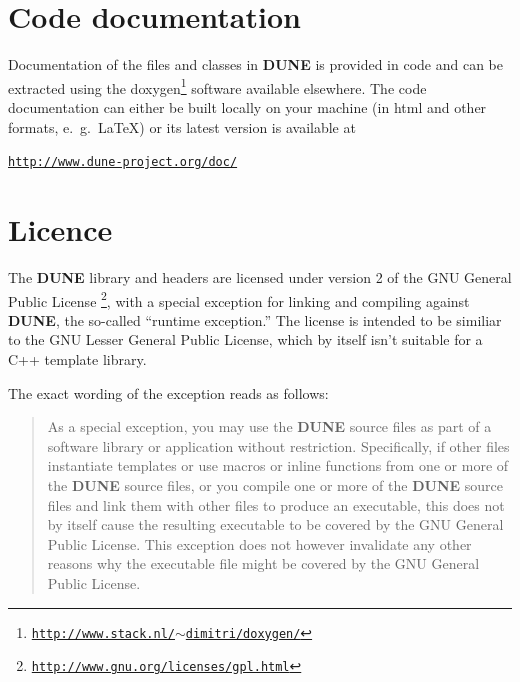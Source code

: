 \documentclass[11pt,a4paper,headinclude,footinclude,DIV16,normalheadings]{scrreprt}
\newcommand{\Dune}{{\sf\bfseries DUNE}}
\begin{document}
\section{Code documentation}

Documentation of the files and classes in \Dune{} is provided in code and
can be extracted using the
doxygen\footnote{\href{http://www.stack.nl/~dimitri/doxygen/}{\texttt{http://www.stack.nl/$\sim$dimitri/doxygen/}}}
software available elsewhere. The code documentation can either be built
locally on your machine (in html and other formats, e.~g.~\LaTeX) 
or its latest version is available at
\begin{center}
\href{http://www.dune-project.org/doc/}%
{\texttt{http://www.dune-project.org/doc/}}
\end{center}


\section{Licence}

The \Dune{} library and headers are licensed under version 2 of the
GNU General Public License%
\footnote{\href{http://www.gnu.org/licenses/gpl.html}%
  {\texttt{http://www.gnu.org/licenses/gpl.html}}}, with a special
exception for linking and compiling against \Dune{}, the so-called
``runtime exception.''  The license is intended to be similiar to the
GNU Lesser General Public License, which by itself isn't suitable for
a C++ template library.

The exact wording of the exception reads as follows:

\begin{quote}  
   As a special exception, you may use the \Dune{} source files as part
   of a software library or application without restriction.
   Specifically, if other files instantiate templates or use macros or
   inline functions from one or more of the \Dune{} source files, or you
   compile one or more of the \Dune{} source files and link them with
   other files to produce an executable, this does not by itself cause
   the resulting executable to be covered by the GNU General Public
   License.  This exception does not however invalidate any other
   reasons why the executable file might be covered by the GNU General
   Public License.
\end{quote}
\end{document}
